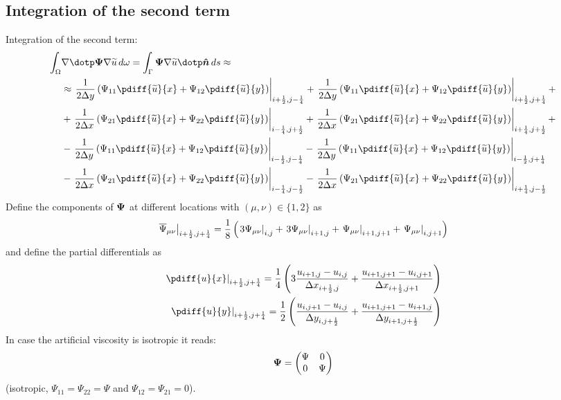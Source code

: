 \subsection*{Integration of the second term}
Integration of the second term:
%
\begin{align}
    \int_\Omega & \nabla \dotp \bPsi \nabla \widetilde{u}\, d\omega  =
    \int_\Gamma \bPsi \nabla \widetilde{u} \dotp \vec{\hat n}\, ds \approx
    \\
    & \approx
    \left. \frac{1}{2\Dy}\left( \Psi_{11} \pdiff{\widetilde{u}}{x} + \Psi_{12} \pdiff{\widetilde{u}}{y} \right) \right|_{i+\half,j-\quart}
    + \left. \frac{1}{2\Dy} \left( \Psi_{11} \pdiff{\widetilde{u}}{x} + \Psi_{12} \pdiff{\widetilde{u}}{y} \right) \right|_{i+\half,j+\quart} +
    \\
    &
    + \left. \frac{1}{2\Dx} \left( \Psi_{21} \pdiff{\widetilde{u}}{x} + \Psi_{22} \pdiff{\widetilde{u}}{y} \right) \right|_{i-\quart,j+\half}
    + \left. \frac{1}{2\Dx} \left( \Psi_{21} \pdiff{\widetilde{u}}{x} + \Psi_{22} \pdiff{\widetilde{u}}{y} \right) \right|_{i+\quart,j+\half} +
    \\
    &
    -  \left. \frac{1}{2\Dy} \left( \Psi_{11} \pdiff{\widetilde{u}}{x} + \Psi_{12} \pdiff{\widetilde{u}}{y} \right) \right|_{i-\half,j-\quart}
    -  \left. \frac{1}{2\Dy} \left( \Psi_{11} \pdiff{\widetilde{u}}{x} + \Psi_{12} \pdiff{\widetilde{u}}{y} \right) \right|_{i-\half,j+\quart}
    \\
    &
    - \left. \frac{1}{2\Dx} \left( \Psi_{21} \pdiff{\widetilde{u}}{x} + \Psi_{22} \pdiff{\widetilde{u}}{y} \right)  \right|_{i-\quart,j-\half}
    - \left. \frac{1}{2\Dx} \left( \Psi_{21} \pdiff{\widetilde{u}}{x} + \Psi_{22} \pdiff{\widetilde{u}}{y} \right)  \right|_{i+\quart,j-\half}
\end{align}
%
Define the components of $\boldsymbol{\Psi}$ at different locations with $(\mu, \nu) \in \{ 1, 2\}$ as
%
\begin{align}
    \left. \overline\Psi_{\mu\nu} \right|_{i+\frac{1}{2},j+\frac{1}{4}} = \frac{1}{8} \left(\left. 3\Psi_{\mu\nu} \right|_{i,j}
    + \left. 3\Psi_{\mu\nu} \right|_{i+1,j} + \left. \Psi_{\mu\nu} \right|_{i+1,j+1}  + \left. \Psi_{\mu\nu} \right|_{i,j+1}\right)
\end{align}
%
and define the partial differentials as
\begin{align}
    \left. \pdiff{u}{x} \right|_{i+\half,j+\quart} =  \quart \left(3\frac{u_{i+1,j} - u_{i,j}}{\Dx_{i+\half,j}} + \frac{u_{i+1,j+1} - u_{i,j+1}}{\Dx_{i+\half,j+1}}\right)
    \\
    \left. \pdiff{u}{y} \right|_{i+\half,j+\quart} =  \half \left(\frac{u_{i,j+1} - u_{i,j}}{\Dy_{i,j+\half}} + \frac{u_{i+1,j+1} - u_{i+1,j}}{\Dy_{i+1,j+\half}}\right)
\end{align}
%
In case the artificial viscosity is isotropic it reads:
\begin{align}
    \boldsymbol{\Psi} =
    \begin{pmatrix}
        \Psi & 0 \\
        0 & \Psi
    \end{pmatrix}
\end{align}
 (isotropic, $\Psi_{11} = \Psi_{22} = \Psi$ and $\Psi_{12} = \Psi_{21} = 0$).

